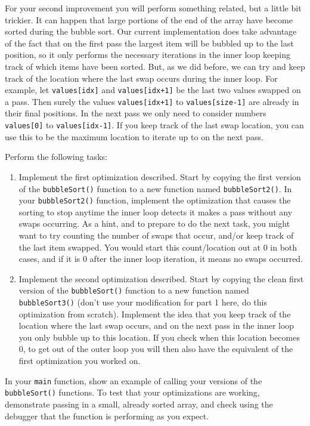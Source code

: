 \documentclass[11pt]{article}
\begin{document}
For your second improvement you will perform something related, but a
little bit trickier.  It can happen that large portions of the end of
the array have become sorted during the bubble sort.  Our current
implementation does take advantage of the fact that on the first pass
the largest item will be bubbled up to the last position, so it only
performs the necessary iterations in the inner loop keeping track of
which items have been sorted.  But, as we did before, we can try and
keep track of the location where the last swap occurs during the inner
loop.  For example, let \verb~values[idx]~ and \verb~values[idx+1]~ be the 
last two values swapped on a pass.  Then surely the values
\verb~values[idx+1]~ to \verb~values[size-1]~ are already in their final
positions.  In the next pass we only need to consider numbers
\verb~values[0]~ to \verb~values[idx-1]~.  If you keep track of the last
swap location, you can use this to be the maximum location to
iterate up to on the next pass.

Perform the following tasks:

\begin{enumerate}
\item Implement the first optimization described.  Start by copying the
first version of the \verb~bubbleSort()~ function to a new function
named \verb~bubbleSort2()~.  In your \verb~bubbleSort2()~ function, implement
the optimization that causes the sorting to stop anytime the inner
loop detects it makes a pass without any swaps occurring.  As a
hint, and to prepare to do the next task, you might want to try
counting the number of swaps that occur, and/or keep track of the
last item swapped.  You would start this count/location out at 0 in
both cases, and if it is 0 after the inner loop iteration, it means
no swaps occurred.

\item Implement the second optimization described.  Start by copying the
clean first version of the \verb~bubbleSort()~ function to a new
function named \verb~bubbleSort3()~ (don't use your modification for
part 1 here, do this optimization from scratch).  Implement the
idea that you keep track of the location where the last swap
occurs, and on the next pass in the inner loop you only bubble up
to this location.  If you check when this location becomes 0, to
get out of the outer loop you will then also have the equivalent of
the first optimization you worked on.
\end{enumerate}

In your \verb~main~ function, show an example of calling your versions of
the \verb~bubbleSort()~ functions.  To test that your optimizations are
working, demonstrate passing in a small, already sorted array, and
check using the debugger that the function is performing as you
expect.
\end{document}
